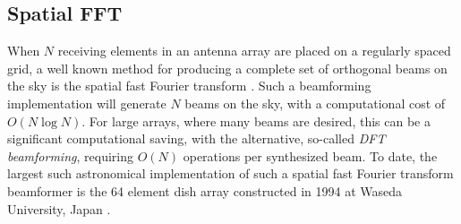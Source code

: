 \documentclass[useAMS,macros,usenatbib]{mn2e}
\begin{document}
%
%
%

\subsection{Spatial FFT}
\label{s-engine}
 
When $N$ receiving elements in an antenna array are placed on a regularly spaced grid, a well known method for producing a complete set of orthogonal beams on the sky is the spatial fast Fourier transform \citep{fastbeamforming}.
Such a beamforming implementation will generate $N$ beams on the sky, with a computational cost of $O(N\log{N})$. For large arrays, where many beams are desired, this can be a significant computational saving, with the alternative, so-called \emph{DFT beamforming}, requiring $O(N)$ operations per synthesized beam.
To date, the largest such astronomical implementation of such a spatial fast Fourier transform beamformer is the 64 element dish array constructed in 1994 at Waseda University, Japan \citep{2dfft}.
\end{document}
